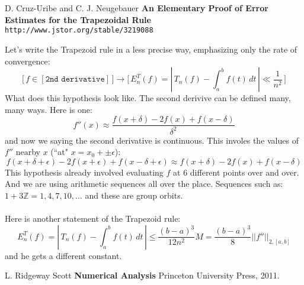 \documentclass[12pt]{article}
\begin{document}
\vfill

\begin{thebibliography}{}

\item D. Cruz-Uribe and C. J. Neugebauer \textbf{An Elementary Proof of Error Estimates for the Trapezoidal Rule} \texttt{ http://www.jstor.org/stable/3219088}
 
\end{thebibliography} 

\newpage

\noindent 

Let's write the Trapezoid rule in a less precise way, emphasizing only the rate of convergence:
$$ \bigg[\, f \in [\texttt{2nd derivative}] \,\bigg] 
\to \Bigg[\,E_n^T(f) = \left|\, T_n(f) - \int_a^b f(t) \, dt \,\right| \ll \frac{1}{n^2}\, \Bigg] $$
What does this hypothesis look like.  The second derivive can be defined many, many ways.  Here is one:
$$ f''(x) \approx  \frac{f(x+\delta)-2f(x)+f(x-\delta)}{\delta^2}$$
and now we saying the second derivative is continuous.  This involes the values of $f''$ nearby $x$ (``at" $x = x_0 + \pm \epsilon$):
$$ f(x+\delta + \epsilon)-2f(x + \epsilon)+f(x-\delta + \epsilon) \approx f(x+\delta)-2f(x)+f(x-\delta)$$
This hypothesis already involved evaluating $f$ at 6 different points over and over.  And we are using arithmetic sequences all over the place.  Sequences such as: $ 1 + 3 \mathbb{Z} = 1,4,7,10,\dots $ and these are group orbits. \\ \\
Here is another statement of the Trapezoid rule:
$$  E_n^T(f) = \left|\, T_n(f) - \int_a^b f(t) \, dt \,\right| \leq \frac{(b-a)^3}{12n^2}M = \frac{(b-a)^3}{8} ||f''||_{2, [a,b]} $$
and he gets a different constant.

\vfill

\begin{thebibliography}{}

\item L. Ridgeway Scott \textbf{Numerical Analysis} Princeton University Press, 2011.
 
\end{thebibliography} 
\end{document}
